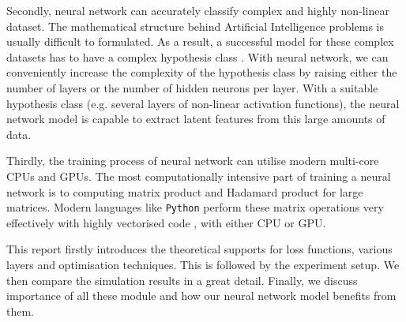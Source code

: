Secondly, neural network can accurately classify complex and highly non-linear dataset. The mathematical structure behind Artificial Intelligence problems is usually difficult to formulated. As a result, a successful model for these complex datasets has to have a complex hypothesis class \citep{Bishop:2006:PRM:1162264}. 
With neural network, we can conveniently increase the complexity of the hypothesis class by raising either the number of layers or the number of hidden neurons per layer. 
With a suitable hypothesis class (e.g. several layers of non-linear activation functions), the neural network model is capable to extract latent features from this large amounts of data.

Thirdly, the training process of neural network can utilise modern multi-core CPUs and GPUs. The most computationally intensive part of training a neural network is to computing matrix product and Hadamard product for large matrices. Modern languages like \texttt{Python} perform these matrix operations very effectively with highly vectorised code \citep{5725236}, with either CPU or GPU.

This report firstly introduces the theoretical supports for loss functions, various layers and optimisation techniques. 
This is followed by the experiment setup. We then compare the simulation results in a great detail.
Finally, we discuss importance of all these module and how our neural network model benefits from them.
